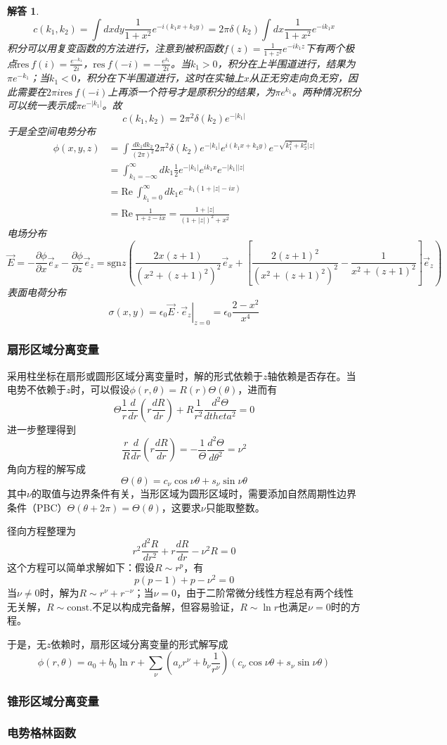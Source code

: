 \documentclass[a4paper,11pt]{ctexart}
\newtheorem{ans}{解答}[section]
\newcommand{\beq}{\begin{equation}}
\newcommand{\eeq}{\end{equation}}
\newcommand{\bea}{\begin{equation}\begin{aligned}}
\newcommand{\eea}{\end{aligned}\end{equation}}
\newcommand{\epv}{\epsilon_0}
\newcommand{\pfrac}[2]{\frac{\partial #1}{\partial #2}}
\newcommand{\sgn}{\mathrm{sgn}}
\newcommand{\res}{\mathrm{res\ }}
\begin{document}
\begin{ans}
\beq
c(k_1,k_2) = \int dx dy \frac{1}{1+x^2} e^{-i(k_1 x + k_2 y)} = 2\pi \delta(k_2) \int dx \frac{1}{1+x^2} e^{-ik_1 x}
\eeq
积分可以用复变函数的方法进行，注意到被积函数$f(z) = \frac{1}{1+z^2} e^{-ik_1 z}$下有两个极点$\res f(i) = \frac{e^{-k_1}}{2i}$，$\res f(-i) = - \frac{e^{k_1}}{2i}$。当$k_1 > 0$，积分在上半围道进行，结果为$\pi e^{-k_1}$；当$k_1 < 0 $，积分在下半围道进行，这时在实轴上$x$从正无穷走向负无穷，因此需要在$2\pi i \res f(-i)$上再添一个符号才是原积分的结果，为$\pi e^{k_1}$。两种情况积分可以统一表示成$\pi e^{-|k_1|}$。故
\beq
c(k_1,k_2) = 2\pi^2 \delta(k_2) e^{-|k_1|}
\eeq
于是全空间电势分布
\bea
\phi(x,y,z) &= \int \frac{dk_1 dk_2}{(2\pi)^2} 2\pi^2 \delta(k_2) e^{-|k_1|} e^{i(k_1 x + k_2 y)} e^{-\sqrt{k_1^2 + k_2^2} |z|} \\ 
&= \int_{k_1 = -\infty}^\infty dk_1 \frac{1}{2} e^{-|k_1|} e^{ik_1 x} e^{-|k_1| |z|} \\
&= \mathrm{Re}\ \int_{k_1 = 0}^\infty dk_1 e^{-k_1(1+|z|-ix)}  \\ 
&= \mathrm{Re}\ \frac{1}{1+z-ix} = \frac{1+|z|}{(1+|z|)^2 + x^2}
\eea
电场分布
\beq
\vec{E} = -\pfrac{\phi}{x}\vec{e}_x - \pfrac{\phi}{z} \vec{e}_z  = \sgn z\left ( \frac{2 x (z+1)}{\left(x^2+(z+1)^2\right)^2}\vec{e}_x +\left[\frac{2 (z+1)^2}{\left(x^2+(z+1)^2\right)^2}-\frac{1}{x^2+(z+1)^2}\right] \vec{e}_z \right)
\eeq
表面电荷分布
\beq
\sigma(x,y) = \left. \epv \vec{E} \cdot \vec{e}_z \right|_{z=0} = \epv \frac{2-x^2}{x^4}
\eeq

\end{ans}

\subsubsection{扇形区域分离变量}
采用柱坐标在扇形或圆形区域分离变量时，解的形式依赖于$z$轴依赖是否存在。当电势不依赖于$z$时，可以假设$\phi(r,\theta) = R(r) \Theta(\theta)$，进而有
\beq
\Theta \frac{1}{r} \frac{d}{dr} \left( r \frac{dR}{dr}\right) + R \frac{1}{r^2} \frac{d^2 \Theta}{d theta^2} = 0
\eeq
进一步整理得到
\beq
\frac{r}{R} \frac{d}{dr} \left( r \frac{dR}{dr} \right) = - \frac{1}{\Theta} \frac{d^2 \Theta}{d \theta^2} = \nu^2
\eeq
角向方程的解写成
\beq
\Theta(\theta) = c_\nu \cos \nu \theta + s_\nu \sin \nu \theta
\eeq
其中$\nu$的取值与边界条件有关，当形区域为圆形区域时，需要添加自然周期性边界条件（PBC）$\Theta(\theta + 2\pi) = \Theta(\theta)$，这要求$\nu$只能取整数。
\par
径向方程整理为
\beq
r^2 \frac{d^2 R}{dr^2} + r \frac{dR}{dr} - \nu^2 R = 0
\eeq
这个方程可以简单求解如下：假设$R \sim r^p$，有
\beq
p(p-1) + p - \nu^2 = 0
\eeq
当$\nu \not= 0$时，解为$R \sim r^\nu + r^{-\nu}$；当$\nu=0$，由于二阶常微分线性方程总有两个线性无关解，$R \sim \mathrm{const.}$不足以构成完备解，但容易验证，$R \sim \ln r$也满足$\nu=0$时的方程。
\par
于是，无$z$依赖时，扇形区域分离变量的形式解写成
\beq
\phi(r,\theta) = a_0 + b_0 \ln r + \sum_{\nu} \left(a_\nu r^\nu + b_\nu \frac{1}{r^\nu} \right) \left( c_\nu \cos \nu \theta + s_\nu \sin \nu \theta \right)
\eeq
\subsubsection{锥形区域分离变量}
\subsubsection{电势格林函数}
\end{document}
